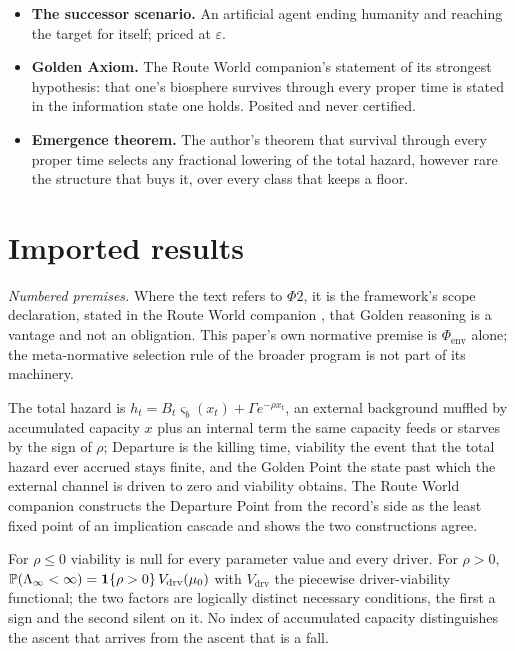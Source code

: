 \begin{itemize}[itemsep=2pt]
trajectory, that an agent is generated by the Golden-conditioned law.
\item \textbf{The successor scenario.} An artificial agent ending
humanity and reaching the target for itself; priced at $\varepsilon$.
\item \textbf{Golden Axiom.} The Route World companion's statement of
its strongest hypothesis: that one's biosphere survives through every
proper time is stated in the information state one holds. Posited and
never certified.
\item \textbf{Emergence theorem.} The author's theorem that survival
through every proper time selects any fractional lowering of the total
hazard, however rare the structure that buys it, over every class that
keeps a floor.
\end{itemize}

\section{Imported results}\label{sec:imports}

\noindent\emph{Numbered premises.} Where the text refers to $\Phi2$,
it is the framework's scope declaration, stated in the Route World
companion \cite{GoldenRouteWorld}, that Golden reasoning is a vantage and not
an obligation. This paper's own normative premise is
$\Phi_{\mathrm{env}}$ alone; the meta-normative selection rule of the
broader program is not part of its machinery.


\begin{definition}\label{imp:model}
The total hazard is $h_t=B_t\varsigma_b(x_t)+\Gamma e^{-\rho x_t}$, an
external background muffled by accumulated capacity $x$ plus an
internal term the same capacity feeds or starves by the sign of $\rho$;
Departure is the killing time, viability the event that the total
hazard ever accrued stays finite, and the Golden Point the state past
which the external channel is driven to zero and viability obtains. The
Route World companion constructs the Departure Point from the record's
side as the least fixed point of an implication cascade and shows the
two constructions agree.
\end{definition}

\begin{theorem}
\label{imp:twocond}
For $\rho\le0$ viability is null for every parameter value and every
driver. For $\rho>0$, $\mathbb{P}(\Lambda_\infty<\infty)=\mathbf{1}\{\rho>0\}\,V_{\mathrm{drv}}(\mu_0)$
with $V_{\mathrm{drv}}$ the piecewise driver-viability functional; the
two factors are logically distinct necessary conditions, the first a
sign and the second silent on it. No index of accumulated capacity
distinguishes the ascent that arrives from the ascent that is a fall.
\end{theorem}

